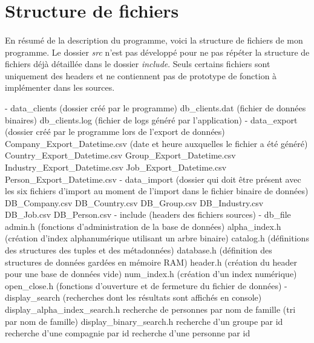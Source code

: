\documentclass{article}
\begin{document}
    \newpage
    \section{Structure de fichiers}
    \paragraph{}
    En résumé de la description du programme, voici la structure de fichiers de mon programme. Le dossier \emph{src} n'est pas développé pour ne pas répéter la structure de fichiers déjà détaillée dans le dossier \emph{include}. Seuls certains fichiers sont uniquement des headers et ne contiennent pas de prototype de fonction à implémenter dans les sources.

    \begin{verbatimtab}
    - data_clients (dossier créé par le programme)
        db_clients.dat (fichier de données binaires)
        db_clients.log (fichier de logs généré par l'application)
    - data_export (dossier créé par le programme lors de l'export de données)
        Company_Export_Datetime.csv (date et heure auxquelles le fichier a été généré)
        Country_Export_Datetime.csv
        Group_Export_Datetime.csv
        Industry_Export_Datetime.csv
        Job_Export_Datetime.csv
        Person_Export_Datetime.csv
    - data_import (dossier qui doit être présent avec les six fichiers d'import
                    au moment de l'import dans le fichier binaire de données)
        DB_Company.csv
        DB_Country.csv
        DB_Group.csv
        DB_Industry.csv
        DB_Job.csv
        DB_Person.csv
    - include (headers des fichiers sources)
        - db_file
            admin.h (fonctions d'administration de la base de données)
            alpha_index.h (création d'index alphanumérique utilisant un arbre binaire)
            catalog.h (définitions des structures des tuples et des métadonnées)
            database.h (définition des structures de données gardées en mémoire RAM)
            header.h (création du header pour une base de données vide)
            num_index.h (création d'un index numérique)
            open_close.h (fonctions d'ouverture et de fermeture du fichier de données)
        - display_search (recherches dont les résultats sont affichés en console)
            display_alpha_index_search.h
                recherche de personnes par nom de famille (tri par nom de famille)
            display_binary_search.h
                recherche d'un groupe par id
                recherche d'une compagnie par id
                recherche d'une personne par id

\end{verbatimtab}
\end{document}
